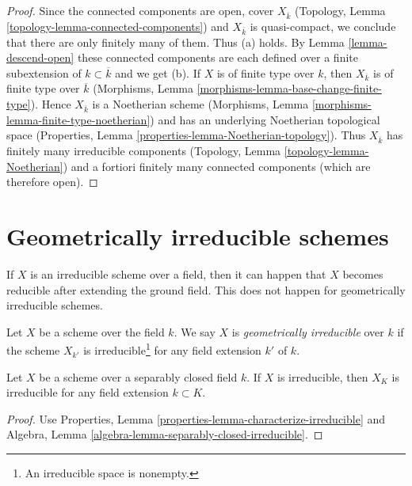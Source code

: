 \begin{proof}
Since the connected components are open, cover $X_{\overline{k}}$
(Topology, Lemma \ref{topology-lemma-connected-components}) and
$X_{\overline{k}}$ is quasi-compact, we conclude that there are only
finitely many of them. Thus (a) holds.
By Lemma \ref{lemma-descend-open} these connected components
are each defined over a finite subextension of $k \subset \overline{k}$
and we get (b).
If $X$ is of finite type over $k$, then $X_{\overline{k}}$ is of finite
type over $\overline{k}$
(Morphisms, Lemma \ref{morphisms-lemma-base-change-finite-type}).
Hence $X_{\overline{k}}$ is a Noetherian scheme
(Morphisms, Lemma \ref{morphisms-lemma-finite-type-noetherian}) and has
an underlying Noetherian topological space
(Properties, Lemma \ref{properties-lemma-Noetherian-topology}).
Thus $X_{\overline{k}}$ has finitely many irreducible components
(Topology, Lemma \ref{topology-lemma-Noetherian})
and a fortiori finitely many connected components (which are
therefore open).
\end{proof}









\section{Geometrically irreducible schemes}
\label{section-geometrically-irreducible}

\noindent
If $X$ is an irreducible scheme over a field, then it can happen that $X$
becomes reducible after extending the ground field. This does not happen
for geometrically irreducible schemes.

\begin{definition}
\label{definition-geometrically-irreducible}
Let $X$ be a scheme over the field $k$.
We say $X$ is {\it geometrically irreducible} over $k$ if the scheme
$X_{k'}$ is irreducible\footnote{An irreducible space is nonempty.}
for any field extension $k'$ of $k$.
\end{definition}

\begin{lemma}
\label{lemma-separably-closed-irreducible}
Let $X$ be a scheme over a separably closed field $k$.
If $X$ is irreducible, then $X_K$ is irreducible for any
field extension $k \subset K$.
\end{lemma}

\begin{proof}
Use Properties, Lemma \ref{properties-lemma-characterize-irreducible}
and Algebra, Lemma \ref{algebra-lemma-separably-closed-irreducible}.
\end{proof}

